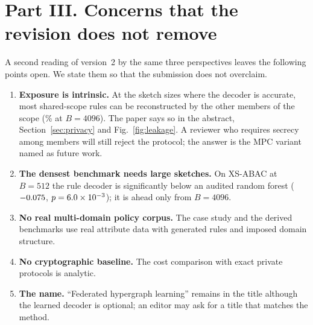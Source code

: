 \documentclass[11pt,a4paper]{article}
\begin{document}
\section*{Part III. Concerns that the revision does not remove}
A second reading of version~2 by the same three perspectives leaves the following points open. We state them so that the submission does not overclaim.
\begin{enumerate}
\item \textbf{Exposure is intrinsic.} At the sketch sizes where the decoder is accurate, most shared-scope rules can be reconstructed by the other members of the scope (\lkallBmmmmxcvi\% at $B=4096$). The paper says so in the abstract, Section~\ref{sec:privacy} and Fig.~\ref{fig:leakage}. A reviewer who requires secrecy among members will still reject the protocol; the answer is the MPC variant named as future work.
\item \textbf{The densest benchmark needs large sketches.} On XS-ABAC at $B=512$ the rule decoder is significantly below an audited random forest ($-0.075$, $p=6.0\times10^{-3}$); it is ahead only from $B=4096$.
\item \textbf{No real multi-domain policy corpus.} The case study and the derived benchmarks use real attribute data with generated rules and imposed domain structure.
\item \textbf{No cryptographic baseline.} The cost comparison with exact private protocols is analytic.
\item \textbf{The name.} ``Federated hypergraph learning'' remains in the title although the learned decoder is optional; an editor may ask for a title that matches the method.
\end{enumerate}
\end{document}
